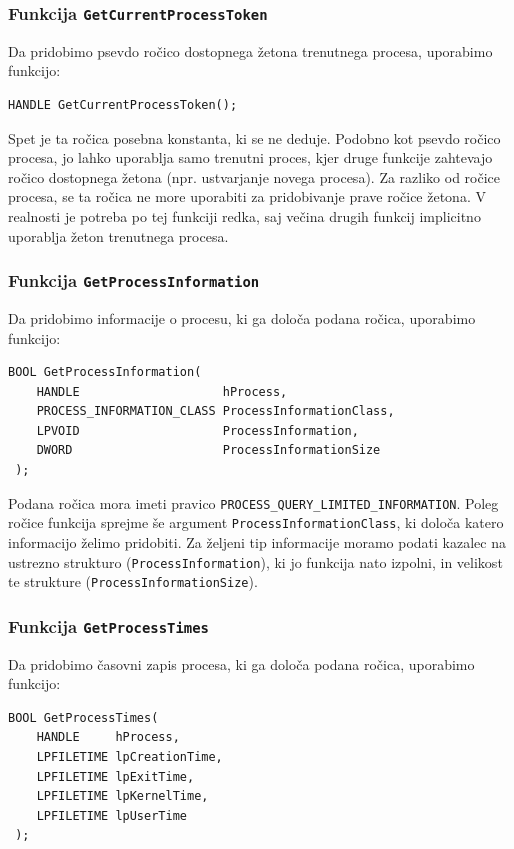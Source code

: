\documentclass[a4paper,12pt,openright]{book}
\begin{document}
\subsubsection{Funkcija \texttt{GetCurrentProcessToken}}

Da pridobimo psevdo ročico dostopnega žetona trenutnega procesa, uporabimo funkcijo:
\begin{lstlisting}[style=func]
 HANDLE GetCurrentProcessToken();
\end{lstlisting}

Spet je ta ročica posebna konstanta, ki se ne deduje.
Podobno kot psevdo ročico procesa, jo lahko uporablja samo trenutni proces, kjer druge funkcije zahtevajo ročico dostopnega žetona (npr. ustvarjanje novega procesa).
Za razliko od ročice procesa, se ta ročica ne more uporabiti za pridobivanje prave ročice žetona.
V realnosti je potreba po tej funkciji redka, saj večina drugih funkcij implicitno uporablja žeton trenutnega procesa.

\subsubsection{Funkcija \texttt{GetProcessInformation}}

Da pridobimo informacije o procesu, ki ga določa podana ročica, uporabimo funkcijo:
\begin{lstlisting}[style=func]
 BOOL GetProcessInformation(
	HANDLE                    hProcess,
	PROCESS_INFORMATION_CLASS ProcessInformationClass,
	LPVOID                    ProcessInformation,
	DWORD                     ProcessInformationSize
 );
\end{lstlisting}

Podana ročica mora imeti pravico \texttt{PROCESS\_QUERY\_LIMITED\_INFORMATION}.
Poleg ročice funkcija sprejme še argument \texttt{ProcessInformationClass}, ki določa katero informacijo želimo pridobiti.
Za željeni tip informacije moramo podati kazalec na ustrezno strukturo (\texttt{ProcessInformation}), ki jo funkcija nato izpolni, in velikost te strukture (\texttt{ProcessInformationSize}).

\subsubsection{Funkcija \texttt{GetProcessTimes}}

Da pridobimo časovni zapis procesa, ki ga določa podana ročica, uporabimo funkcijo:
\begin{lstlisting}[style=func]
 BOOL GetProcessTimes(
	HANDLE     hProcess,
	LPFILETIME lpCreationTime,
	LPFILETIME lpExitTime,
	LPFILETIME lpKernelTime,
	LPFILETIME lpUserTime
 );
\end{lstlisting}
\end{document}
